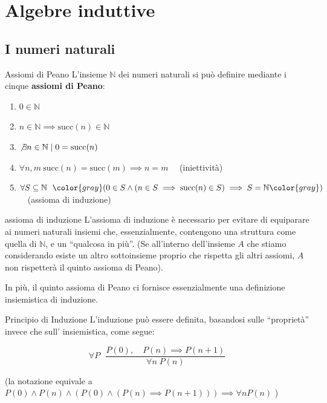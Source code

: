 \documentclass[a4paper,11pt]{report}
\begin{document}
\makecustomcover

\tableofcontents

\chapter{Algebre induttive}

\section{I numeri naturali}

\begin{defframe}{Assiomi di Peano}{}
    L'insieme \(\mathbb{N}\) dei numeri naturali si può definire mediante i cinque \textbf{assiomi di Peano}:
    \begin{enumerate}[label=\arabic*)]
        \item \( 0 \in \mathbb{N} \)
        \item \( n \in  \mathbb{N} \implies \text{succ}(n) \in \mathbb{N} \)
        \item \( \not\exists n \in \mathbb{N} \mid 0 = \text{succ}(n) \)
        \item \( \forall n, m \ \text{succ}(n) = \text{succ}(m) \implies n = m \) \ \  {\color{gray}\small (iniettività)}
        \item \( \forall S \subseteq \mathbb{N} \ \ {\color{gray}(}0 \in S \land (n \in S \implies \text{succ}(n)\in S) \implies S = \mathbb{N}{\color{gray})}\) \ \ {\color{gray}\small (assioma di induzione)}

    \end{enumerate} 

    \begin{gframe}{assioma di induzione}
        L'assioma di induzione è necessario per evitare di equiparare ai numeri naturali insiemi che, essenzialmente, contengono una struttura come quella di \( \mathbb{N} \), e un ``qualcosa in più''. (Se all'interno dell'insieme \( A \) che stiamo considerando esiste un altro sottoinsieme proprio che rispetta gli altri assiomi, \( A \) non rispetterà il quinto assioma di Peano). 

        In più, il quinto assioma di Peano ci fornisce essenzialmente una definizione insiemistica di induzione.
    \end{gframe}

\end{defframe}

\begin{defframe}{Principio di Induzione}{}
    L'induzione può essere definita, basandosi sulle ``proprietà'' invece che 
    sull' insiemistica, come segue:

    \[
        \forall P \ \ \ \frac{P(0), \quad P(n) \implies P(n+1)}{\forall n\; P(n)}
    \]

    (la notazione equivale a \( P(0) \land P(n) \land (P(0) \land (P(n) \implies P(n+1)))  \implies \forall n P(n) \) )

\end{defframe}
\end{document}
